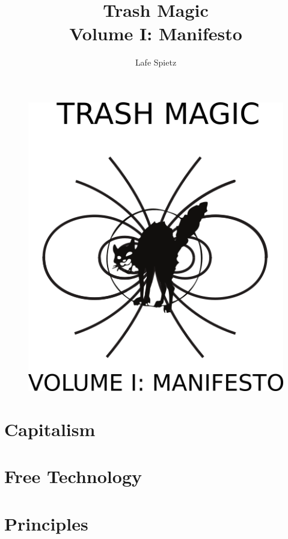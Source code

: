 \documentclass[ebook,12pt,openany,onesided]{memoir} %
\title{Trash Magic \\ Volume I: Manifesto}
\author{Lafe Spietz}
\begin{document}
\frontmatter
\begin{figure}[htbp]
\centering
\includegraphics{images/frontcover.png}
\end{figure}

\clearpage

\clearpage



\newpage
\thispagestyle{empty}
\mbox{}



\maketitle

\tableofcontents

\listoffigures 

\mainmatter
\chapter{Capitalism}


\chapter{Free Technology}


\chapter{Principles}

\end{document}
